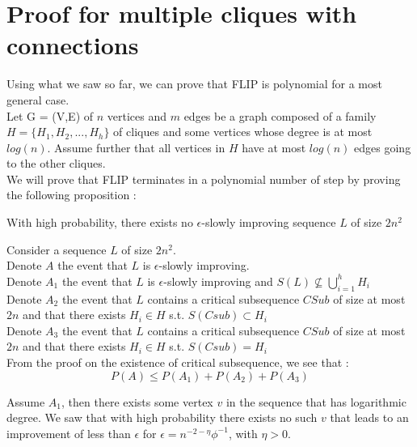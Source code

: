 \section{Proof for multiple cliques with connections}
Using what we saw so far, we can prove that FLIP is polynomial for a most general case. \\
Let G = (V,E) of $n$ vertices and $m$ edges be a graph composed of a family $H = \{H_1, H_2,..., H_h\}$ of cliques and some vertices whose degree is at most $log(n)$. Assume further that all vertices in $H$ have at most $log(n)$ edges going to the other cliques.\\
We will prove that FLIP terminates in a polynomial number of step by proving the following proposition :
\begin{proposition}
With high probability, there exists no $\epsilon$-slowly improving sequence $L$ of size $2n^2$
\end{proposition}

Consider a sequence $L$ of size $2n^2$.\\
Denote $A$ the event that $L$ is $\epsilon$-slowly improving.\\
Denote $A_1$ the event that $L$ is $\epsilon$-slowly improving and $S(L) \not\subseteq \bigcup_{i = 1}^{h}H_i$\\
Denote $A_2$ the event that $L$ contains a critical subsequence $CSub$ of size at most $2n$ and that there exists $H_i \in H$ s.t. $ S(Csub) \subset H_i$ \\
Denote $A_3$ the event that $L$ contains a critical subsequence $CSub$ of size at most $2n$ and that there exists $H_i \in H$ s.t. $ S(Csub) = H_i$\\

From the proof on the existence of critical subsequence, we see that :
\begin{equation*}
P(A) \leq P(A_1) + P(A_2) + P(A_3)
\end{equation*}
 
Assume $A_1$, then there exists some vertex $v$ in the sequence that has logarithmic degree. We saw that with high probability there exists no such $v$ that leads to an improvement of less than $\epsilon$ for $\epsilon = n^{-2-\eta}\phi^{-1}$, with $\eta > 0$.\\

